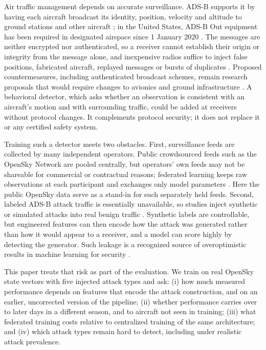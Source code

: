 \documentclass[conference]{IEEEtran}
\begin{document}
Air traffic management depends on accurate surveillance. ADS-B supports it by having each aircraft broadcast its identity, position, velocity and altitude to ground stations and other aircraft \cite{strohmeier2014}; in the United States, ADS-B Out equipment has been required in designated airspace since 1 January 2020 \cite{faa91225}. The messages are neither encrypted nor authenticated, so a receiver cannot establish their origin or integrity from the message alone, and inexpensive radios suffice to inject false positions, fabricated aircraft, replayed messages or bursts of duplicates \cite{costin2012,schafer2013,strohmeier2015,ahmed2026survey}. Proposed countermeasures, including authenticated broadcast schemes, remain research proposals that would require changes to avionics and ground infrastructure \cite{strohmeier2015,ngamboe2025cabba}. A behavioral detector, which asks whether an observation is consistent with an aircraft's motion and with surrounding traffic, could be added at receivers without protocol changes. It complements protocol security; it does not replace it or any certified safety system.

Training such a detector meets two obstacles. First, surveillance feeds are collected by many independent operators. Public crowdsourced feeds such as the OpenSky Network \cite{schafer2014} are pooled centrally, but operators' own feeds may not be shareable for commercial or contractual reasons; federated learning keeps raw observations at each participant and exchanges only model parameters \cite{mcmahan2017}. Here the public OpenSky data serve as a stand-in for such separately held feeds. Second, labeled ADS-B attack traffic is essentially unavailable, so studies inject synthetic or simulated attacks into real benign traffic \cite{li2020,wang2020,ahmed2025}. Synthetic labels are controllable, but engineered features can then encode how the attack was generated rather than how it would appear to a receiver, and a model can score highly by detecting the generator. Such leakage is a recognized source of overoptimistic results in machine learning for security \cite{arp2022,kapoor2023}.

This paper treats that risk as part of the evaluation. We train on real OpenSky state vectors with five injected attack types and ask: (i) how much measured performance depends on features that encode the attack construction, and on an earlier, uncorrected version of the pipeline; (ii) whether performance carries over to later days in a different season, and to aircraft not seen in training; (iii) what federated training costs relative to centralized training of the same architecture; and (iv) which attack types remain hard to detect, including under realistic attack prevalence.
\end{document}
